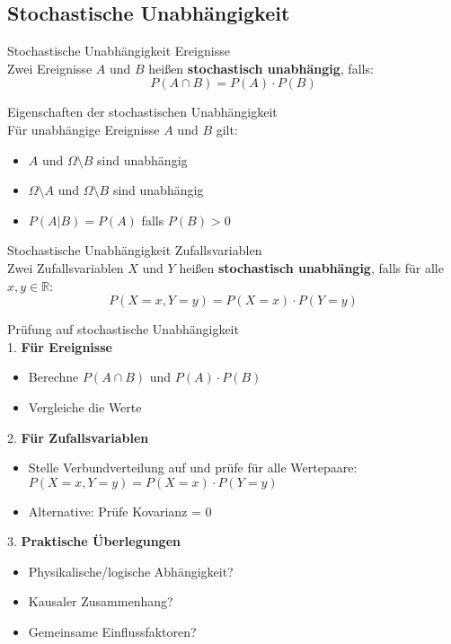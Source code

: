 \subsection{Stochastische Unabhängigkeit}

\begin{theorem}{Stochastische Unabhängigkeit Ereignisse}\\
Zwei Ereignisse $A$ und $B$ heißen \textbf{stochastisch unabhängig}, falls:
$$P(A \cap B) = P(A) \cdot P(B)$$
\end{theorem}

\begin{corollary}{Eigenschaften der stochastischen Unabhängigkeit}\\
Für unabhängige Ereignisse $A$ und $B$ gilt:
\begin{itemize}
    \item $A$ und $\Omega \setminus B$ sind unabhängig
    \item $\Omega \setminus A$ und $\Omega \setminus B$ sind unabhängig
    \item $P(A|B) = P(A)$ falls $P(B) > 0$
\end{itemize}
\end{corollary}

\begin{theorem}{Stochastische Unabhängigkeit Zufallsvariablen}\\
Zwei Zufallsvariablen $X$ und $Y$ heißen \textbf{stochastisch unabhängig}, falls für alle $x,y \in \mathbb{R}$:
$$P(X=x, Y=y) = P(X=x) \cdot P(Y=y)$$
\end{theorem}

\begin{KR}{Prüfung auf stochastische Unabhängigkeit}\\
1. \textbf{Für Ereignisse}
   \begin{itemize}
   \item Berechne $P(A \cap B)$ und $P(A) \cdot P(B)$
   \item Vergleiche die Werte
   \end{itemize}

2. \textbf{Für Zufallsvariablen}
   \begin{itemize}
   \item Stelle Verbundverteilung auf und prüfe für alle Wertepaare:\\ $P(X=x, Y=y) = P(X=x) \cdot P(Y=y)$
   \item Alternative: Prüfe Kovarianz = 0
   \end{itemize}

3. \textbf{Praktische Überlegungen}
   \begin{itemize}
   \item Physikalische/logische Abhängigkeit?
   \item Kausaler Zusammenhang?
   \item Gemeinsame Einflussfaktoren?
   \end{itemize}
\end{KR}

